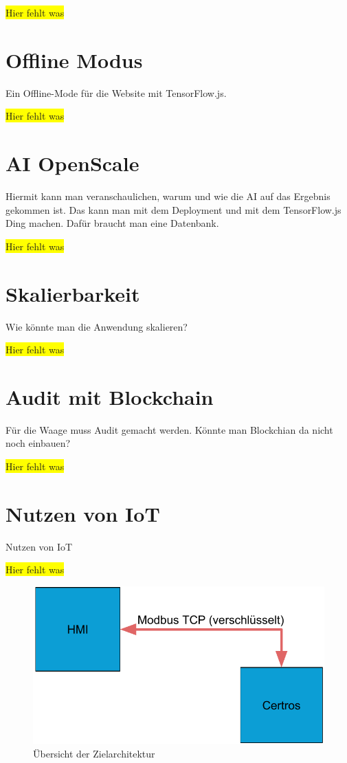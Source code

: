 \colorbox{yellow}{Hier fehlt was}

\section{Offline Modus}
Ein Offline-Mode für die Website mit TensorFlow.js.

\colorbox{yellow}{Hier fehlt was}

\section{AI OpenScale}
\label{ai_openscale}
Hiermit kann man veranschaulichen, warum und wie die AI auf das Ergebnis gekommen ist. Das kann man mit dem Deployment
und mit dem TensorFlow.js Ding machen. Dafür braucht man eine Datenbank.

\colorbox{yellow}{Hier fehlt was}

\section{Skalierbarkeit}
Wie könnte man die Anwendung skalieren?

\colorbox{yellow}{Hier fehlt was}

\section{Audit mit Blockchain}
Für die Waage muss Audit gemacht werden. Könnte man Blockchian da nicht noch einbauen?

\colorbox{yellow}{Hier fehlt was}

\section{Nutzen von IoT}
Nutzen von IoT

\colorbox{yellow}{Hier fehlt was}

\begin{figure}[h]
    \centering
    \includegraphics[width=\textwidth]{images/kapitel_6/iot_waage.pdf}
    \caption{Übersicht der Zielarchitektur}
    \label{fig:ausblick_iot}
\end{figure}


